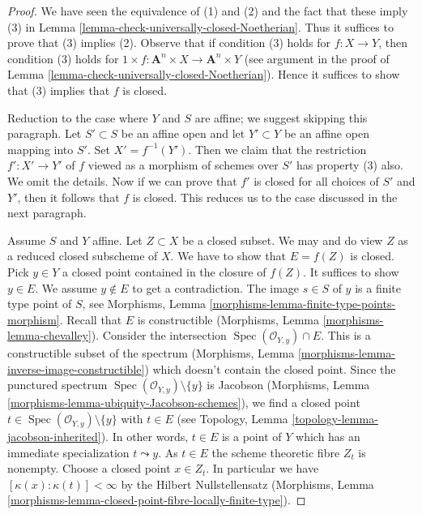 \documentclass[10pt,a4paper]{amsart}
\theoremstyle{plain}
\theoremstyle{definition}
\theoremstyle{remark}
\numberwithin{equation}{subsection}
\def\Spec{\mathop{\mathrm{Spec}}}
\begin{document}
\begin{proof}
We have seen the equivalence of (1) and (2) and the
fact that these imply (3) in
Lemma \ref{lemma-check-universally-closed-Noetherian}.
Thus it suffices to prove that (3) implies (2).
Observe that if condition (3) holds for $f : X \to Y$,
then condition (3) holds for
$1 \times f : \mathbf{A}^n \times X \to \mathbf{A}^n \times Y$
(see argument in the proof of
Lemma \ref{lemma-check-universally-closed-Noetherian}).
Hence it suffices to show that (3) implies that $f$ is closed.

\medskip\noindent
Reduction to the case where $Y$ and $S$ are affine; we suggest
skipping this paragraph.
Let $S' \subset S$ be an affine open and let $Y' \subset Y$ be an
affine open mapping into $S'$. Set $X' = f^{-1}(Y')$. Then we
claim that the restriction $f' : X' \to Y'$ of $f$ viewed as a morphism
of schemes over $S'$ has property (3) also. We omit the details.
Now if we can prove that $f'$ is closed for all choices of
$S'$ and $Y'$, then it follows that $f$ is closed. This reduces
us to the case discussed in the next paragraph.

\medskip\noindent
Assume $S$ and $Y$ affine. Let $Z \subset X$ be a closed subset.
We may and do view $Z$ as a reduced closed subscheme of $X$.
We have to show that $E = f(Z)$ is closed. Pick $y \in Y$ a closed point
contained in the closure of $f(Z)$. It suffices to show $y \in E$.
We assume $y \not \in E$ to get a contradiction.
The image $s \in S$ of $y$ is a finite type point of $S$, see
Morphisms, Lemma \ref{morphisms-lemma-finite-type-points-morphism}.
Recall that $E$ is constructible
(Morphisms, Lemma \ref{morphisms-lemma-chevalley}).
Consider the intersection $\Spec(\mathcal{O}_{Y, y}) \cap E$.
This is a constructible subset of the spectrum
(Morphisms, Lemma \ref{morphisms-lemma-inverse-image-constructible})
which doesn't contain the closed point.
Since the punctured spectrum
$\Spec(\mathcal{O}_{Y, y}) \setminus \{y\}$ is Jacobson
(Morphisms, Lemma \ref{morphisms-lemma-ubiquity-Jacobson-schemes}), we find a
closed point $t \in \Spec(\mathcal{O}_{Y, y}) \setminus \{y\}$
with $t \in E$ (see Topology, Lemma \ref{topology-lemma-jacobson-inherited}).
In other words, $t \in E$ is a point of $Y$ which
has an immediate specialization $t \leadsto y$.
As $t \in E$ the scheme theoretic fibre $Z_t$ is nonempty.
Choose a closed point $x \in Z_t$. In particular we have
$[\kappa(x) : \kappa(t)] < \infty$ by the Hilbert Nullstellensatz
(Morphisms, Lemma
\ref{morphisms-lemma-closed-point-fibre-locally-finite-type}).


\end{proof}
\end{document}
